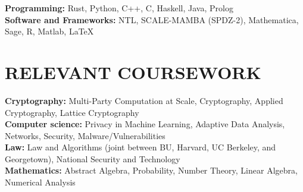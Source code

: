 \documentclass{res}
\begin{document}
\begin{resume}
\textbf{Programming:} Rust, Python, C++, C, Haskell, Java, Prolog\\         
\textbf{Software and Frameworks:} NTL, SCALE-MAMBA (SPDZ-2), Mathematica, Sage, R, Matlab, \LaTeX \\



\section{RELEVANT COURSEWORK}   
\vspace{0.1in}

    \textbf{Cryptography:} Multi-Party Computation at Scale, Cryptography,
    Applied Cryptography, Lattice Cryptography \\
    \textbf{Computer science:} Privacy in Machine Learning, Adaptive Data Analysis, 
    Networks, Security, Malware/Vulnerabilities \\   
    \textbf{Law:} Law and Algorithms (joint between BU, Harvard, UC Berkeley, and Georgetown), National Security and Technology \\
    \textbf{Mathematics:} Abstract Algebra, Probability, Number Theory, Linear Algebra,
    Numerical Analysis  \\








\end{resume}
\end{document}
